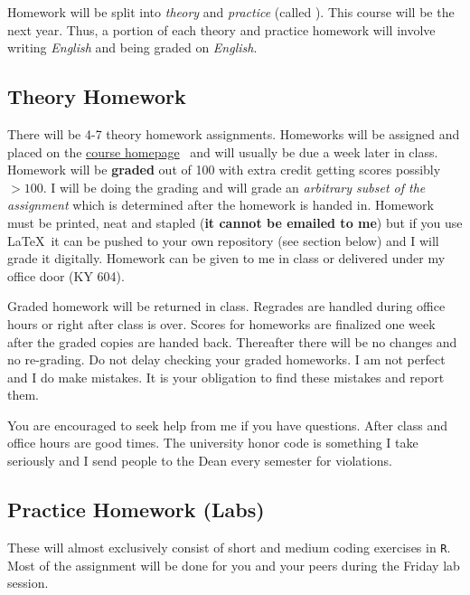 \documentclass[12pt]{article}
\newcommand{\coursewebpage}{\href{https://github.com/kapelner/QC_Math_390.4_Spring_2020}{course homepage}}
\begin{document}
Homework will be split into \textit{theory} and \textit{practice} (called ). This course will be the  next year. Thus, a portion of each theory and practice homework will involve writing \textit{English} and being graded on \textit{English}.

\subsection*{Theory Homework}

There will be 4-7 theory homework assignments. Homeworks will be assigned and placed on the \coursewebpage~ and will usually be due a week later in class. Homework will be \textbf{graded} out of 100 with extra credit getting scores possibly $> 100$. I will be doing the grading and will grade an \textit{arbitrary subset of the assignment} which is determined after the homework is handed in. Homework must be printed, neat and stapled (\textbf{it cannot be emailed to me}) but if you use \LaTeX~it can be pushed to your own repository (see  section below) and I will grade it digitally. Homework can be given to me in class or delivered under my office door (KY 604).

Graded homework will be returned in class. Regrades are handled during office hours or right after class is over. Scores for homeworks are finalized one week after the graded copies are handed back. Thereafter there will be no changes and no re-grading. Do not delay checking your graded homeworks. I am not perfect and I do make mistakes. It is your obligation to find these mistakes and report them.

You are encouraged to seek help from me if you have questions. After class and office hours are good times.   The university honor code is something I take seriously and I send people to the Dean every semester for violations.

\subsection*{Practice Homework (Labs)}

These will almost exclusively consist of short and medium coding exercises in \texttt{R}. Most of the assignment will be done for you and your peers during the Friday lab session.
\end{document}
